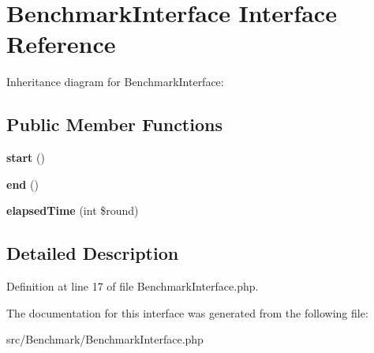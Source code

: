 \hypertarget{interface_zest_1_1_benchmark_1_1_benchmark_interface}{}\section{Benchmark\+Interface Interface Reference}
\label{interface_zest_1_1_benchmark_1_1_benchmark_interface}


Inheritance diagram for Benchmark\+Interface\+:
\subsection*{Public Member Functions}
\begin{DoxyCompactItemize}
\item 
\mbox{\label{interface_zest_1_1_benchmark_1_1_benchmark_interface_af8fa59992209e36dccb3eefb0f75531f}} 
{\bfseries start} ()
\item 
\mbox{\label{interface_zest_1_1_benchmark_1_1_benchmark_interface_a817082ace0e2589d27b22890290aa4a9}} 
{\bfseries end} ()
\item 
\mbox{\label{interface_zest_1_1_benchmark_1_1_benchmark_interface_abe2f70e1853b27f020d4432e27f7e8a1}} 
{\bfseries elapsed\+Time} (int \$round)
\end{DoxyCompactItemize}


\subsection{Detailed Description}


Definition at line 17 of file Benchmark\+Interface.\+php.



The documentation for this interface was generated from the following file\+:\begin{DoxyCompactItemize}
\item 
src/\+Benchmark/Benchmark\+Interface.\+php\end{DoxyCompactItemize}
